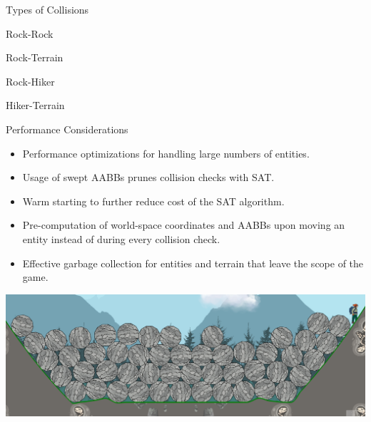 \begin{frame}{Types of Collisions}
\begin{minipage}{\textwidth}
\begin{minipage}{0.24\textwidth}
        \end{minipage}
    \end{minipage}
    \begin{minipage}{\textwidth}
        \centering
        \begin{minipage}{0.24\textwidth}
            \centering
            Rock-Rock
        \end{minipage}
        \begin{minipage}{0.24\textwidth}
            \centering
            Rock-Terrain
        \end{minipage}
        \begin{minipage}{0.24\textwidth}
            \centering
            Rock-Hiker
        \end{minipage}
        \begin{minipage}{0.24\textwidth}
            \centering
            Hiker-Terrain
        \end{minipage}
    \end{minipage}
\end{frame}

\begin{frame}{Performance Considerations}
    \begin{itemize}
        \item Performance optimizations for handling large numbers of entities.
        \item Usage of swept AABBs prunes collision checks with SAT.
        \item Warm starting to further reduce cost of the SAT algorithm.
        \item Pre-computation of world-space coordinates and AABBs upon moving an entity instead of during every collision check.
        \item Effective garbage collection for entities and terrain that leave the scope of the game.
    \end{itemize}
    \centering
    \includegraphics[width=.6\textwidth]{figures/sim.png}
\end{frame}